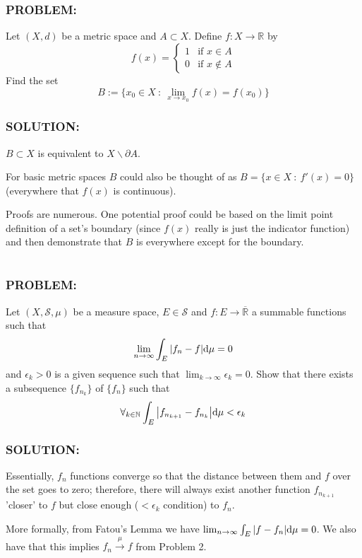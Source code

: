 \documentclass[]{article}
\newcommand{\Problem}{\subsubsection*{\textbf{PROBLEM:}}}
\newcommand{\Solution}{\subsubsection*{\textbf{SOLUTION:}}}
\newcommand{\N}{\mathbb{N}}
\newcommand{\R}{\mathbb{R}}
\newcommand{\SigAlg}{\mathcal{S}}
\newcommand{\st}{\ : \ }
\begin{document}
\newpage
\section{}
\Problem
Let $(X,d)$ be a metric space and $A \subset X$.
Define $f : X \to \R$ by \[
    f(x) = \begin{cases}
        1 &\text{if } x \in A\\
        0 &\text{if } x \notin A
    \end{cases}
\]
Find the set \[
    B := \{x_0 \in X \st \lim_{x \to x_0} f(x) = f(x_0)\}
\]

\Solution
$B \subset X$ is equivalent to $X \backslash \partial A$.

For basic metric spaces $B$ could also be thought of as $B = \{x \in X \st f'(x) = 0\}$ (everywhere that $f(x)$ is continuous).

Proofs are numerous.
One potential proof could be based on the limit point definition of a set's boundary (since $f(x)$ really is just the indicator function) and then demonstrate that $B$ is everywhere except for the boundary.


\newpage
\section{}
\Problem
Let $(X, \SigAlg,\mu)$ be a measure space, $E \in \SigAlg$ and $f : E \to \overline{\R}$ a summable functions such that \[
    \lim_{n\to\infty} \int_{E} \abs{f_n - f} \dd \mu = 0
\] and $\epsilon_k > 0$ is a given sequence such that $\lim_{k\to\infty} \epsilon_k = 0$.
Show that there exists a subsequence $\{f_{n_k}\}$ of $\{f_n\}$ such that\[
    \forall_{k \in \N} \int_{E} \abs{f_{n_{k+1}} - f_{n_k}} \dd \mu < \epsilon_k
\]

\Solution

Essentially, $f_n$ functions converge so that the distance between them and $f$ over the set goes to zero; therefore, there will always exist another function $f_{n_{k+1}}$ 'closer' to $f$ but close enough ($< \epsilon_k$ condition) to $f_n$.

More formally, from Fatou's Lemma we have $\lim_{n \to \infty} \int_{E} \abs{f - f_n} \dd \mu = 0$.
We also have that this implies $f_n \xrightarrow{\mu} f$ from Problem 2.
\end{document}
